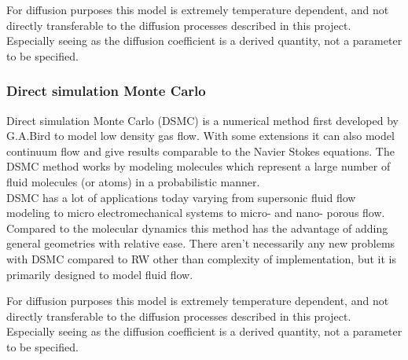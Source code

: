 For diffusion purposes this model is extremely temperature dependent, and not directly transferable to the diffusion processes described in this project. 
Especially seeing as the diffusion coefficient is a derived quantity, not a parameter to be specified.

\subsubsection{Direct simulation Monte Carlo}\label{DSMC_description}
Direct simulation Monte Carlo (DSMC) is a numerical method first developed by G.A.Bird to model low density gas flow. 
With some extensions it can also model continuum flow and give results comparable to the Navier Stokes equations. 
The DSMC method works by modeling molecules which represent a large number of fluid molecules (or atoms) in a probabilistic manner. \\
DSMC has a lot of applications today varying from supersonic fluid flow modeling to micro electromechanical systems to micro- and nano- porous flow. \\

Compared to the molecular dynamics this method has the advantage of adding general geometries with relative ease. 
There aren't necessarily any new problems with DSMC compared to RW other than complexity of implementation, but it is primarily designed to model fluid flow. 

For diffusion purposes this model is extremely temperature dependent, and not directly transferable to the diffusion processes described in this project. 
Especially seeing as the diffusion coefficient is a derived quantity, not a parameter to be specified.


